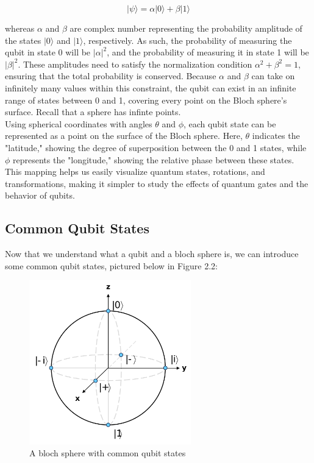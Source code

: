  \vspace{0.01cm} 
\large
\begin{equation}
  |\psi\rangle = \alpha |0\rangle + \beta |1\rangle
\end{equation}
\normalsize 
\vspace{0.01cm} 

whereas $\alpha$ and $\beta$ are complex number representing the probability amplitude of the states $|0\rangle$ and $|1\rangle$, respectively. As such, the probability of measuring the qubit in state 0 will be $|\alpha|^2$, and the probability of measuring it in state 1 will be $|\beta|^2$. These amplitudes need to satisfy the normalization condition $\alpha^2 + \beta^2 = 1$, ensuring that the total probability is conserved.  Because $\alpha$ and $\beta$ can take on infinitely many values within this constraint, the qubit can exist in an infinite range of states between 0 and 1, covering every point on the Bloch sphere’s surface. Recall that a sphere has infinte points.\\ 

Using spherical coordinates with angles $\theta$ and $\phi$, each qubit state can be represented as a point on the surface of the Bloch sphere. Here, $\theta$ indicates the "latitude," showing the degree of superposition between the 0 and 1 states, while $\phi$ represents the "longitude," showing the relative phase between these states. This mapping helps us easily visualize quantum states, rotations, and transformations, making it simpler to study the effects of quantum gates and the behavior of qubits. 


\subsection{Common Qubit States}

Now that we understand what a qubit and a bloch sphere is, we can introduce some common qubit states, pictured below in Figure 2.2:

\begin{figure}[ht]
\centering
\includegraphics[width=7cm]{images/commonstatesbloch.png}
\caption{A bloch sphere with common qubit states}
\end{figure}

